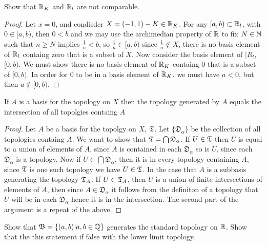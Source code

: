 


\maketitle
\question
Show that $\mathbb{R}_K$ and $\mathbb{R}_l$ are not comparable. 


\begin{proof}
    Let $x = 0$, and condisder $X = (-1, 1) - K \in \mathbb{R}_K$. For any $[a ,b) \subset \mathbb{R}_l$, with $0 \in [a, b)$, then $0 < b$ and we may use the archimedian 
    property of $\mathbb{R}$ to fix $N \in \mathbb{N}$ such that $n \geq N$ implies $\frac{1}{n} < b$, so $\frac{1}{n} \in [a, b)$ since $\frac{1}{n} \notin X$, there is no 
    basis element of $\mathbb{R}_l$ containg zero that is a subset of $X$. Now consider the basis element of $|R_l$, $[0, b)$. We must show there is no 
    basis element of $\mathbb{R}_K$ containg $0$ that is a subset of $[0, b)$. In order for $0$ to be in a basis element of $\mathbb{R}_K$.
    we must have $a < 0$, but then $a \notin [0, b)$. 
\end{proof}

\question
If $A$ is a basis for the topology on $X$ then the topology generated by $A$ equals the intersection of all topolgies containg $A$ 


\begin{proof}
    Let $A$ be a basis for the topolgy on $X$, $\mathfrak{T}$. Let $\{ \mathfrak{D}_{\alpha} \}$ be the collection of all topologies containg $A$. 
    We want to show that $\mathfrak{T} = \bigcap \mathfrak{D}_\alpha$. If $U \in \mathfrak{T}$ then $U$ is equal to a union of elements of $A$, since
    $A$ is contained in each $\mathfrak{D}_\alpha$ so is $U$, since each $\mathfrak{D}_\alpha$ is a topology. Now if $U \in \bigcap \mathfrak{D}_\alpha$, 
    then it is in every topology containing $A$, since $\mathfrak{T}$ is one such topology we have $U \in \mathfrak{T}$.  In the case that $A$ is a subbasis generating 
    the topology $\mathfrak{T}_A$. If $U \in \mathfrak{T}_A$, then $U$ is a union of finite intersections of elements of $A$, then since $A \in \mathfrak{D}_\alpha$ it follows 
    from the definiton of a topology that $U$ will be in each $\mathfrak{D}_\alpha$ hence it is in the intersection. The second part of the argument is a repeat of the above. 

\end{proof}


\question 
Show that $\mathfrak{B} = \{(a, b)| a, b \in \mathbb{Q}\}$ generates the standard topology on $\mathbb{R}$. Show that the this statement if false with the lower limit topology.

